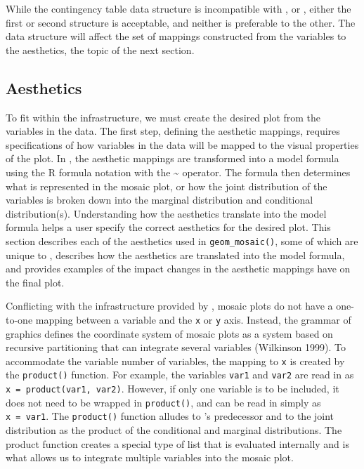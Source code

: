 While the contingency table data structure is incompatible with , or , either the first or second structure is acceptable, and neither is preferable to the other. The data structure will affect the set of mappings constructed from the variables to the aesthetics, the topic of the next section.

\hypertarget{aesthetics}{%
\subsection*{Aesthetics}\label{aesthetics}}

To fit  within the  infrastructure, we must create the desired plot from the variables in the data. The first step, defining the aesthetic mappings, requires specifications of how variables in the data will be mapped to the visual properties of the plot. In , the aesthetic mappings are transformed into a model formula using the R formula notation with the \textasciitilde{} operator. The formula then determines what is represented in the mosaic plot, or how the joint distribution of the variables is broken down into the marginal distribution and conditional distribution(s). Understanding how the aesthetics translate into the model formula helps a user specify the correct aesthetics for the desired plot. This section describes each of the aesthetics used in \texttt{geom\_mosaic()}, some of which are unique to , describes how the aesthetics are translated into the model formula, and provides examples of the impact changes in the aesthetic mappings have on the final plot.

Conflicting with the infrastructure provided by , mosaic plots do not have a one-to-one mapping between a variable and the \texttt{x} or \texttt{y} axis. Instead, the grammar of graphics defines the coordinate system of mosaic plots as a system based on recursive partitioning that can integrate several variables (Wilkinson 1999). To accommodate the variable number of variables, the mapping to \texttt{x} is created by the \texttt{product()} function. For example, the variables \texttt{var1} and \texttt{var2} are read in as \texttt{x\ =\ product(var1,\ var2)}. However, if only one variable is to be included, it does not need to be wrapped in \texttt{product()}, and can be read in simply as \texttt{x\ =\ var1}. The \texttt{product()} function alludes to 's predecessor  and to the joint distribution as the product of the conditional and marginal distributions. The product function creates a special type of list that is evaluated internally and is what allows us to integrate multiple variables into the mosaic plot.

